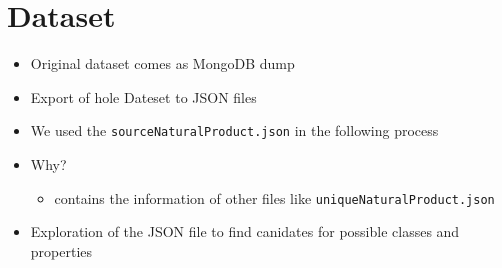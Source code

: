 \documentclass[
]{ceurart}
\begin{document}
\begin{table}[h]
    \centering
    \caption{Resources described in this paper.}
    \label{tab:resources}
\end{table}

\section{Dataset}
\begin{itemize}
    \item Original dataset comes as MongoDB dump
    \item Export of hole Dateset to JSON files
    \item We used the \texttt{sourceNaturalProduct.json} in the following process
    \item Why?
    \begin{itemize}
        \item contains the information of other files like \texttt{uniqueNaturalProduct.json}
    \end{itemize}
    \item Exploration of the JSON file to find canidates for possible classes and properties
\end{itemize}
\end{document}
